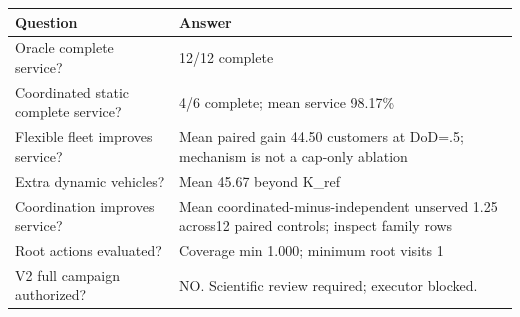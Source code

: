 \begin{tabular}{ll}
\toprule
Question & Answer \\
\midrule
Oracle complete service? & 12/12 complete \\
Coordinated static complete service? & 4/6 complete; mean service 98.17\% \\
Flexible fleet improves service? & Mean paired gain 44.50 customers at DoD=.5; mechanism is not a cap-only ablation \\
Extra dynamic vehicles? & Mean 45.67 beyond K\_ref \\
Coordination improves service? & Mean coordinated-minus-independent unserved 1.25 across12 paired controls; inspect family rows \\
Root actions evaluated? & Coverage min 1.000; minimum root visits 1 \\
V2 full campaign authorized? & NO. Scientific review required; executor blocked. \\
\bottomrule
\end{tabular}
